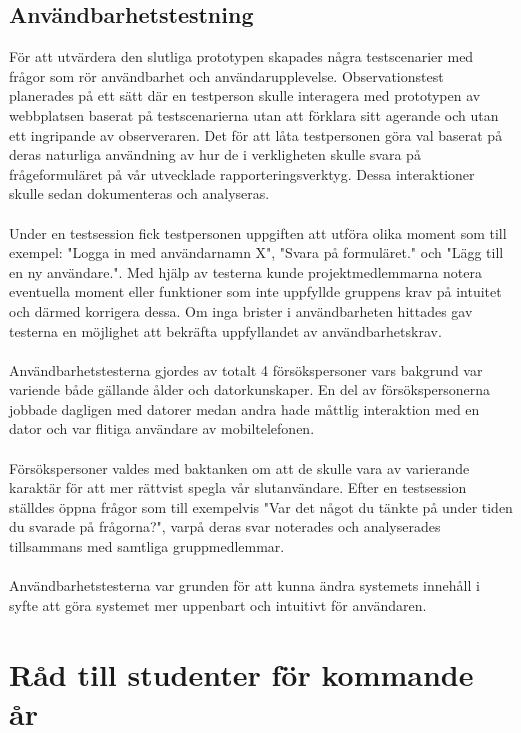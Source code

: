 \documentclass[12pt]{article}
\begin{document}
\subsection{Användbarhetstestning}
För att utvärdera den slutliga prototypen skapades några testscenarier med frågor som rör användbarhet och användarupplevelse. Observationstest planerades på ett sätt där en  testperson skulle interagera med prototypen av webbplatsen baserat på testscenarierna utan att förklara sitt agerande och utan ett ingripande av observeraren. Det för att låta testpersonen göra val baserat på deras naturliga användning av hur de i verkligheten skulle svara på frågeformuläret på vår utvecklade rapporteringsverktyg. Dessa interaktioner skulle sedan dokumenteras och  analyseras.\\\\
Under en testsession fick testpersonen uppgiften att utföra olika moment som till exempel: "Logga in med användarnamn X", "Svara på formuläret." och "Lägg till en ny användare.". Med hjälp av testerna kunde projektmedlemmarna notera eventuella moment eller funktioner som inte uppfyllde gruppens krav på intuitet och därmed korrigera dessa. Om inga brister i användbarheten hittades gav testerna en möjlighet att bekräfta uppfyllandet av användbarhetskrav.\\\\
Användbarhetstesterna gjordes av totalt 4 försökspersoner vars bakgrund var variende både gällande ålder och datorkunskaper. En del av försökspersonerna jobbade dagligen med datorer medan andra hade måttlig interaktion med en dator och var flitiga användare av mobiltelefonen. \\\\
Försökspersoner valdes med baktanken om att de skulle vara av varierande karaktär för att mer rättvist spegla vår slutanvändare. Efter en testsession ställdes öppna frågor som till exempelvis "Var det något du tänkte på under tiden du svarade på frågorna?", varpå deras svar noterades och analyserades tillsammans med samtliga gruppmedlemmar.\\\\
Användbarhetstesterna var grunden för att kunna ändra systemets innehåll i syfte att göra systemet mer uppenbart och intuitivt för användaren.


\section{Råd till studenter för kommande år}
\end{document}
